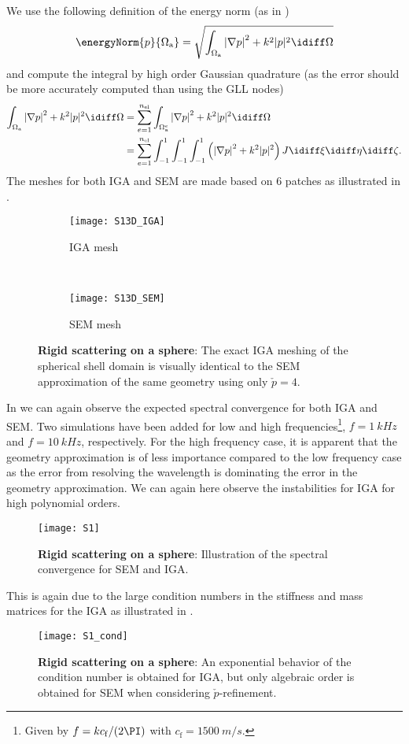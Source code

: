 We use the following definition of the energy norm (as in \cite{Venas2018iao})
\begin{equation}\label{Eq5:energyNormFluids}
	\energyNorm{p}{\Omega_{\mathrm{a}}} = \sqrt{\int_{\Omega_{\mathrm{a}}} \left|\nabla p\right|^2 + k^2|p|^2 \idiff\Omega}
\end{equation}
and compute the integral by high order Gaussian quadrature (as the error should be more accurately computed than using the GLL nodes)
\begin{align*}
	\int_{\Omega_{\mathrm{a}}} \left|\nabla p\right|^2 + k^2|p|^2 \idiff\Omega &= \sum_{e=1}^{n_{\mathrm{el}}} \int_{\Omega_{\mathrm{a}}^e} \left|\nabla p\right|^2 + k^2|p|^2 \idiff\Omega\\
	&= \sum_{e=1}^{n_{\mathrm{el}}} \int_{-1}^1\int_{-1}^1\int_{-1}^1 \left(\left|\nabla p\right|^2 + k^2|p|^2\right)J \idiff\xi\idiff\eta\idiff\zeta.
\end{align*}
The meshes for both IGA and SEM are made based on 6 patches as illustrated in .
\begin{figure}
	\centering
	\begin{subfigure}[t]{0.4\textwidth}
		\centering
		\texttt{[image: S13D\_IGA]}
		\caption{IGA mesh}
	\end{subfigure}
	~    
	\begin{subfigure}[t]{0.4\textwidth}
		\centering
		\texttt{[image: S13D\_SEM]}
		\caption{SEM mesh}
	\end{subfigure}
	\caption{\textbf{Rigid scattering on a sphere}: The exact IGA meshing of the spherical shell domain is visually identical to the SEM approximation of the same geometry using only $\check{p}=4$.}
	\label{Fig5:mesh}
\end{figure}
In  we can again observe the expected spectral convergence for both IGA and SEM. Two simulations have been added for low and high frequencies\footnote{Given by $f=kc_{\mathrm{f}}/(2\PI)$ with $c_{\mathrm{f}}=\SI{1500}{m/s}$.}, $f=\SI{1}{kHz}$ and $f=\SI{10}{kHz}$, respectively. For the high frequency case, it is apparent that the geometry approximation is of less importance compared to the low frequency case as the error from resolving the wavelength is dominating the error in the geometry approximation. We can again here observe the instabilities for IGA for high polynomial orders.
\begin{figure}
	\centering
	\texttt{[image: S1]}
	\caption{\textbf{Rigid scattering on a sphere}: Illustration of the spectral convergence for SEM and IGA.}
	\label{Fig5:S1}
\end{figure}
This is again due to the large condition numbers in the stiffness and mass matrices for the IGA as illustrated in . 
\begin{figure}
	\centering
	\texttt{[image: S1\_cond]}
	\caption{\textbf{Rigid scattering on a sphere}: An exponential behavior of the condition number is obtained for IGA, but only algebraic order is obtained for SEM when considering $\check{p}$-refinement. }
	\label{Fig5:S1_cond}
\end{figure}


